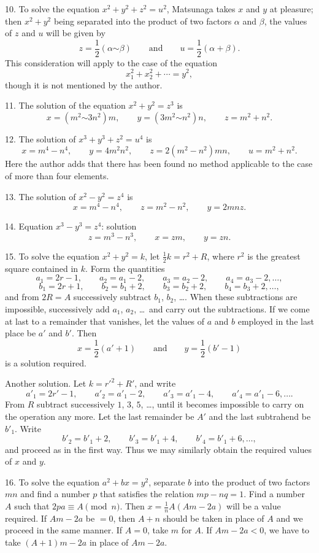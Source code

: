 \documentclass[11pt]{article}
\newcommand{\scanpage}[2]{\clearpage\setcounter{footnote}{0}\noindent{\footnotesize\color{gray}PDF page #1 · #2}\par\medskip}
\newcommand{\scanfooter}{}
\begin{document}
10. To solve the equation $x^2+y^2+z^2=u^2$, Matsunaga takes $x$ and $y$ at pleasure; then $x^2+y^2$ being separated into the product of two factors $\alpha$ and $\beta$, the values of $z$ and $u$ will be given by
\[
z=\frac12(\alpha\mathord{\sim}\beta)\qquad\text{and}\qquad u=\frac12(\alpha+\beta).
\]
This consideration will apply to the case of the equation
\[
x_1^2+x_2^2+\cdots=y^2,
\]
though it is not mentioned by the author.

11. The solution of the equation $x^2+y^2=z^3$ is
\[
x=(m^2\mathord{\sim}3n^2)m,\qquad y=(3m^2\mathord{\sim}n^2)n,\qquad z=m^2+n^2.
\]

12. The solution of $x^3+y^3+z^2=u^4$ is
\[
x=m^4-n^4,\qquad y=4m^2n^2,\qquad z=2(m^2-n^2)mn,\qquad u=m^2+n^2.
\]
Here the author adds that there has been found no method applicable to the case of more than four elements.

13. The solution of $x^2-y^2=z^4$ is
\[
x=m^4-n^4,\qquad z=m^2-n^2,\qquad y=2mnz.
\]

14. Equation $x^3-y^3=z^4$: solution
\[
z=m^3-n^3,\qquad x=zm,\qquad y=zn.
\]

15. To solve the equation $x^2+y^2=k$, let $\frac12k=r^2+R$, where $r^2$ is the greatest square contained in $k$. Form the quantities
\[
a_1=2r-1,\qquad a_2=a_1-2,\qquad a_3=a_2-2,\qquad a_4=a_3-2,\ldots,
\]
\[
b_1=2r+1,\qquad b_2=b_1+2,\qquad b_3=b_2+2,\qquad b_4=b_3+2,\ldots,
\]
and from $2R=A$ successively subtract $b_1$, $b_2$, \ldots. When these subtractions are impossible, successively add $a_1$, $a_2$, \ldots\ and carry out the subtractions. If we come at last to a remainder that vanishes, let the values of $a$ and $b$ employed in the last place be $a'$ and $b'$. Then
\[
x=\frac12(a'+1)\qquad\text{and}\qquad y=\frac12(b'-1)
\]
is a solution required.
\scanfooter

\scanpage{0248}{Chapter 32, printed page 234}
Another solution. Let $k=r'^2+R'$, and write
\[
a'_1=2r'-1,\qquad a'_2=a'_1-2,\qquad a'_3=a'_1-4,\qquad a'_4=a'_1-6,\ldots.
\]
From $R$ subtract successively $1$, $3$, $5$, \ldots, until it becomes impossible to carry on the operation any more. Let the last remainder be $A'$ and the last subtrahend be $b'_1$. Write
\[
b'_2=b'_1+2,\qquad b'_3=b'_1+4,\qquad b'_4=b'_1+6,\ldots,
\]
and proceed as in the first way. Thus we may similarly obtain the required values of $x$ and $y$.

16. To solve the equation $a^2+bx=y^2$, separate $b$ into the product of two factors $mn$ and find a number $p$ that satisfies the relation $mp-nq=1$. Find a number $A$ such that $2pa\equiv A\pmod n$. Then $x=\frac1nA(Am-2a)$ will be a value required. If $Am-2a$ be $=0$, then $A+n$ should be taken in place of $A$ and we proceed in the same manner. If $A=0$, take $m$ for $A$. If $Am-2a<0$, we have to take $(A+1)m-2a$ in place of $Am-2a$.
\end{document}
